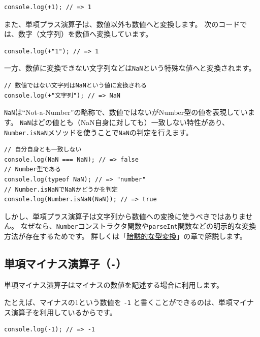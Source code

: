 \begin{lstlisting}
console.log(+1); // => 1
\end{lstlisting}

また、単項プラス演算子は、数値以外も数値へと変換します。
次のコードでは、数字（文字列）を数値へ変換しています。

\begin{lstlisting}
console.log(+"1"); // => 1
\end{lstlisting}

一方、数値に変換できない文字列などは\texttt{NaN}という特殊な値へと変換されます。

\begin{lstlisting}
// 数値ではない文字列はNaNという値に変換される
console.log(+"文字列"); // => NaN
\end{lstlisting}

\texttt{NaN}は``Not-a-Number''の略称で、数値ではないがNumber型の値を表現しています。
\texttt{NaN}はどの値とも（NaN自身に対しても）一致しない特性があり、\texttt{Number.isNaN}メソッドを使うことで\texttt{NaN}の判定を行えます。

\begin{lstlisting}
// 自分自身とも一致しない
console.log(NaN === NaN); // => false
// Number型である
console.log(typeof NaN); // => "number"
// Number.isNaNでNaNかどうかを判定
console.log(Number.isNaN(NaN)); // => true
\end{lstlisting}

しかし、単項プラス演算子は文字列から数値への変換に使うべきではありません。
なぜなら、\texttt{Number}コンストラクタ関数や\texttt{parseInt}関数などの明示的な変換方法が存在するためです。
詳しくは「\hyperlink{implicit-coercion}{暗黙的な型変換}」の章で解説します。

\hypertarget{unary-minus-operator}{%
\subsection{\texorpdfstring{単項マイナス演算子（\texttt{-}）}{単項マイナス演算子（-）}}\label{unary-minus-operator}}

単項マイナス演算子はマイナスの数値を記述する場合に利用します。

たとえば、マイナスの1という数値を \texttt{-1}
と書くことができるのは、単項マイナス演算子を利用しているからです。

\begin{lstlisting}
console.log(-1); // => -1
\end{lstlisting}


